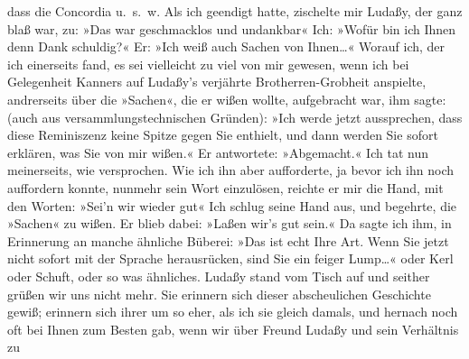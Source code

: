 \begin{ledgroupsized}[t]{13cm}
               dass die Concordia u. s. w. Als ich geendigt
               hatte, zischelte mir Ludaßy, der ganz blaß
               war, zu: »Das war geschmacklos und undankbar{\dotstwo}« Ich: »Wofür
               bin ich Ihnen denn Dank schuldig?« Er: »Ich weiß auch Sachen von Ihnen{\dots}« Worauf ich, der ich einerseits fand, es sei vielleicht
               zu viel von mir gewesen, wenn ich bei Gelegenheit Kanners auf Ludaßy’s verjährte
               Brotherren-Grobheit anspielte, andrerseits über die »Sachen«, die er wißen wollte,
               aufgebracht war, ihm sagte: (auch aus versammlungstechnischen Gründen): »Ich werde
               jetzt aussprechen, dass diese Reminiszenz keine Spitze gegen Sie enthielt, und dann
               werden Sie sofort erklären, was Sie von mir wißen.« Er antwortete: »Abgemacht.« Ich
               tat nun meinerseits, wie versprochen. Wie ich ihn aber aufforderte, ja bevor ich ihn
               noch auffordern konnte, nunmehr sein Wort einzulösen, reichte er mir die Hand, mit
               den Worten: »Sei’n wir wieder gut{\dotstwo}« Ich schlug seine Hand
               aus, und begehrte, die »Sachen« zu wißen. Er blieb dabei: »Laßen wir’s gut sein.« Da
               sagte ich ihm, in Erinnerung an manche ähnliche Büberei: »Das ist echt Ihre Art. Wenn
               Sie jetzt nicht sofort mit {\pb}der
               Sprache herausrücken, sind Sie ein feiger Lump{\dots}« oder
                  Kerl {\dotstwo} oder Schuft, oder so was ähnliches. Ludaßy stand vom Tisch auf und seither grüßen
               wir uns nicht mehr.\pend
           \pstart
           Sie erinnern sich dieser abscheulichen Geschichte gewiß; erinnern sich ihrer um so
               eher, als ich sie gleich damals, und hernach noch oft bei Ihnen zum Besten gab, wenn
               wir über Freund Ludaßy und sein Verhältnis zu

\end{ledgroupsized}
